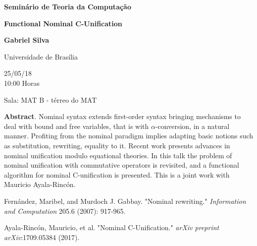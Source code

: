 \documentclass[12pt,a4paper]{article}
\newcommand{\area}{Teoria da Computação}
\newcommand{\hora}{ 10:00 }
\newcommand{\local}{Sala: MAT B - térreo do MAT}
\newcommand{\dia}{25/05/18}
\newcommand{\titulo}{Functional Nominal C-Unification}
\newcommand{\palestrante}{Gabriel Silva}
\newcommand{\universidade}{Universidade de Brasília}
\begin{document}
\pagestyle{empty}

\bigskip

\begin{center}
{ \Large  {\bf\sc Semin\'ario de \area}}
\end{center}



\bigskip
\bigskip

\begin{center}

{\Large\bf \titulo}

\vspace{1cm}

{\large\bf \palestrante}

{\universidade}

\vspace{1.0cm}

\dia \\
\hora  Horas\vspace{0.2cm}

\local
\end{center}

\vspace{0.8cm}



\noindent\textbf{Abstract}. 
Nominal syntax extends first-order syntax bringing mechanisms to deal 
with bound and free variables, that is with $\alpha$-conversion, in a natural manner. 
Profiting from the nominal paradigm implies adapting basic notions such as
substitution, rewriting, equality to it. Recent work presents advances in nominal
unification modulo equational theories. In this
talk the problem of nominal unification with commutative operators is revisited, and
a functional algorithm for nominal C-unification is presented. This is a joint work
with Mauricio Ayala-Rincón.




\begin{thebibliography}{999}



Fernández, Maribel, and Murdoch J. Gabbay. "Nominal rewriting." \textit{Information and
Computation} 205.6 (2007): 917-965.


Ayala-Rincón, Mauricio, et al. "Nominal C-Unification." \textit{arXiv preprint
arXiv}:1709.05384 (2017).

\end{thebibliography}
\end{document}
